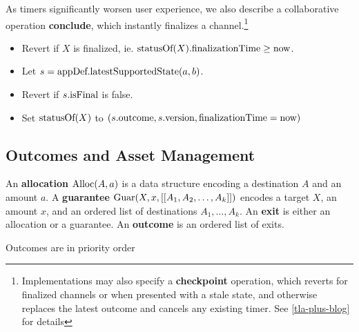 As timers significantly worsen user experience, we also describe a collaborative operation \textbf{conclude}, which instantly finalizes a channel.\footnote{Implementations may also specify a \textbf{checkpoint} operation, which reverts for finalized channels or when presented with a stale state, and otherwise replaces the latest outcome and cancels any existing timer. See \ref{tla-plus-blog} for details}
\begin{itemize}
  \item Revert if $X$ is finalized, ie. $\mbox{statusOf}(X).\mbox{finalizationTime} \ge \mbox{now}$.
  \item Let $s = \mbox{appDef}.\mbox{latestSupportedState}(a, b)$. 
  \item Revert if $s.\mbox{isFinal}$ is false.
  \item Set $\mbox{statusOf}(X)$ to $(s.\mbox{outcome}, s.\mbox{version}, \mbox{finalizationTime} = \mbox{now})$
\end{itemize}

\subsection{Outcomes and Asset Management}\label{sec:outcomes}

An \textbf{allocation} $\mbox{Alloc}(A, a)$ is a data structure encoding a destination $A$ and an amount $a$.
A \textbf{guarantee} $\mbox{Guar}(X, x, [[A_1, A_2, \ldots, A_k]])$ encodes a target $X$, an amount $x$, and an ordered list of destinations $A_1, \ldots, A_k$.
An \textbf{exit} is either an allocation or a guarantee.
An \textbf{outcome} is an ordered list of exits.

Outcomes are in priority order%


